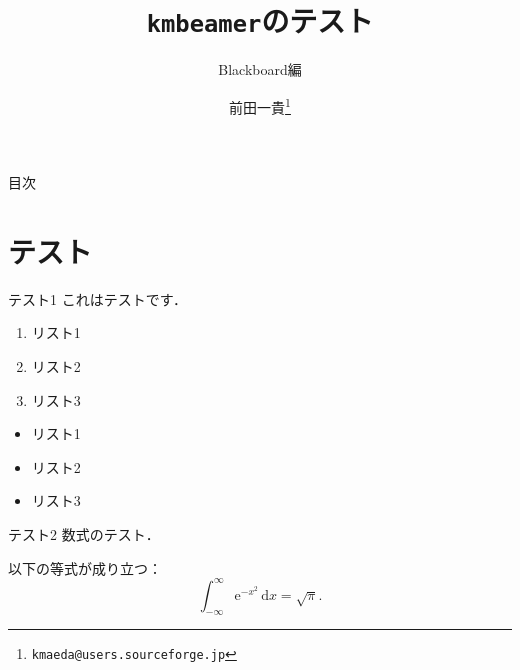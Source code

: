 \documentclass{beamer}
\title{\texttt{kmbeamer}のテスト}
\subtitle{Blackboard編}
\author{前田一貴\footnote{\texttt{kmaeda@users.sourceforge.jp}}}
\begin{document}
\begin{frame}
  \maketitle
\end{frame}

\begin{frame}{目次}
  \tableofcontents
\end{frame}

\section{テスト}

\begin{frame}{テスト1}
  これはテストです．

  \pause

  \begin{enumerate}
  \item リスト1\pause
  \item リスト2\pause
  \item リスト3
  \end{enumerate}

  \pause

  \begin{itemize}
  \item リスト1\pause
  \item リスト2\pause
  \item リスト3
  \end{itemize}
\end{frame}

\begin{frame}{テスト2}
  数式のテスト．

  \begin{theorem}[Gauss積分]
    以下の等式が成り立つ：
    \begin{equation}
      \int_{-\infty}^\infty \mathrm{e}^{-x^2}\,\mathrm{d}x=\sqrt{\pi}.
    \end{equation}
  \end{theorem}
\end{frame}
\end{document}
